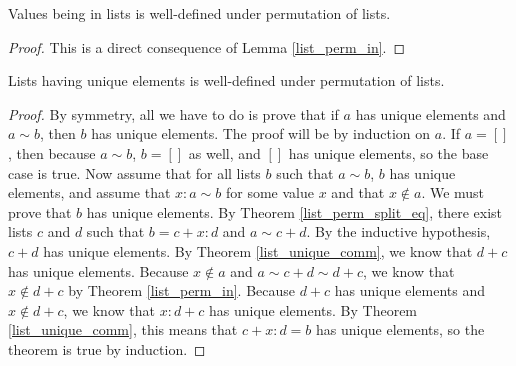 \documentclass[../../math.tex]{subfiles}
\begin{document}
\begin{lemma}
    Values being in lists is well-defined under permutation of lists.
\end{lemma}
\begin{proof}
    This is a direct consequence of Lemma \ref{list_perm_in}.
\end{proof}

\begin{lemma}
    Lists having unique elements is well-defined under permutation of lists.
\end{lemma}
\begin{proof}
    By symmetry, all we have to do is prove that if $a$ has unique elements and
    $a \sim b$, then $b$ has unique elements.  The proof will be by induction on
    $a$.  If $a = []$, then because $a \sim b$, $b = []$ as well, and $[]$ has
    unique elements, so the base case is true.  Now assume that for all lists
    $b$ such that $a \sim b$, $b$ has unique elements, and assume that $x : a
    \sim b$ for some value $x$ and that $x \notin a$.  We must prove that $b$
    has unique elements.  By Theorem \ref{list_perm_split_eq}, there exist lists
    $c$ and $d$ such that $b = c + x : d$ and $a \sim c + d$.  By the inductive
    hypothesis, $c + d$ has unique elements.  By Theorem \ref{list_unique_comm},
    we know that $d + c$ has unique elements.  Because $x \notin a$ and $a \sim
    c + d \sim d + c$, we know that $x \notin d + c$ by Theorem
    \ref{list_perm_in}.  Because $d + c$ has unique elements and $x \notin d +
    c$, we know that $x : d + c$ has unique elements.  By Theorem
    \ref{list_unique_comm}, this means that $c + x : d = b$ has unique elements,
    so the theorem is true by induction.
\end{proof}
\end{document}
